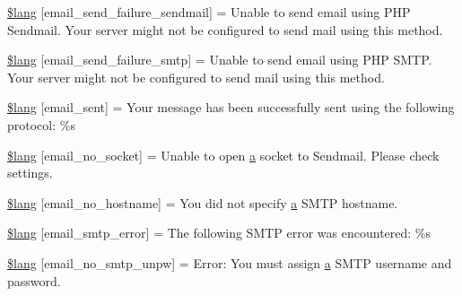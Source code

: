 \begin{DoxyCompactItemize}
\hyperlink{_admin_2system_2language_2english_2email__lang_8php_a0cfda188d86472ad2f3b96a67de75b4d}{\$lang} \mbox{[}\textquotesingle{}email\+\_\+send\+\_\+failure\+\_\+sendmail\textquotesingle{}\mbox{]} = \textquotesingle{}Unable to send email using P\+H\+P Sendmail. Your server might not be configured to send mail using this method.\textquotesingle{}
\item 
\hyperlink{_admin_2system_2language_2english_2email__lang_8php_a37e19fc7057ba5d5300dd3e83cefc5a2}{\$lang} \mbox{[}\textquotesingle{}email\+\_\+send\+\_\+failure\+\_\+smtp\textquotesingle{}\mbox{]} = \textquotesingle{}Unable to send email using P\+H\+P S\+M\+T\+P. Your server might not be configured to send mail using this method.\textquotesingle{}
\item 
\hyperlink{_admin_2system_2language_2english_2email__lang_8php_a7e5c67019fdffb596af1af5a94247ba9}{\$lang} \mbox{[}\textquotesingle{}email\+\_\+sent\textquotesingle{}\mbox{]} = \textquotesingle{}Your message has been successfully sent using the following protocol\+: \%s\textquotesingle{}
\item 
\hyperlink{_admin_2system_2language_2english_2email__lang_8php_a78f8be783ca93e91af775994ddc87cb7}{\$lang} \mbox{[}\textquotesingle{}email\+\_\+no\+\_\+socket\textquotesingle{}\mbox{]} = \textquotesingle{}Unable to open \hyperlink{_admin_2assets_2js_2bootstrap_8min_8js_a1f5870dcf487187f13d5fd328ed9e6e7}{a} socket to Sendmail. Please check settings.\textquotesingle{}
\item 
\hyperlink{_admin_2system_2language_2english_2email__lang_8php_a03905b414e05a5d3cfd0fe88868615f5}{\$lang} \mbox{[}\textquotesingle{}email\+\_\+no\+\_\+hostname\textquotesingle{}\mbox{]} = \textquotesingle{}You did not specify \hyperlink{_admin_2assets_2js_2bootstrap_8min_8js_a1f5870dcf487187f13d5fd328ed9e6e7}{a} S\+M\+T\+P hostname.\textquotesingle{}
\item 
\hyperlink{_admin_2system_2language_2english_2email__lang_8php_a3d70a704117491053ad9c0b4065ecd3f}{\$lang} \mbox{[}\textquotesingle{}email\+\_\+smtp\+\_\+error\textquotesingle{}\mbox{]} = \textquotesingle{}The following S\+M\+T\+P error was encountered\+: \%s\textquotesingle{}
\item 
\hyperlink{_admin_2system_2language_2english_2email__lang_8php_a268c3e96fea16a903e7488f03960e89a}{\$lang} \mbox{[}\textquotesingle{}email\+\_\+no\+\_\+smtp\+\_\+unpw\textquotesingle{}\mbox{]} = \textquotesingle{}Error\+: You must assign \hyperlink{_admin_2assets_2js_2bootstrap_8min_8js_a1f5870dcf487187f13d5fd328ed9e6e7}{a} S\+M\+T\+P username and password.\textquotesingle{}

\end{DoxyCompactItemize}
